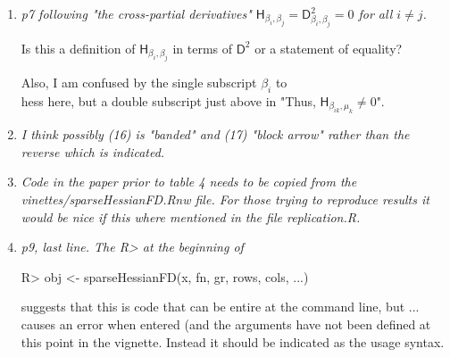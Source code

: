 \documentclass{article}
\newcommand{\parD}[3]{\mathsf{D}^{#1}_{#2}#3}
\newcommand{\hess}[2]{\mathsf{H}_{#1}#2}
\newenvironment{revQuote}{\itshape}{\vspace{\baselineskip}}
\newenvironment{response}{\normalfont}{\vspace{\baselineskip}}
\begin{document}
\begin{enumerate}
\begin{response}
  
\end{response}


\item \begin{revQuote}
p7 following "the cross-partial derivatives"
$\hess{\beta_i,\beta_j}{}=\parD{2}{\beta_i, \beta_j}{}=0$ for all $i\neq
j$.  

  Is this a definition of $\hess{\beta_i,\beta_j}{}$ in terms of  $\parD{2}{}{}$
or a statement of equality?
  
  Also, I am confused by the single subscript $\beta_i$ to \\hess here, but a
double subscript just above in "Thus, $\hess{\beta_{ik},\mu_k}{}\neq 0$".
  \end{revQuote}

\begin{response}
  
\end{response}


\item \begin{revQuote}
 I think possibly (16) is "banded" and (17) "block arrow" rather than the
reverse which is indicated.
  \end{revQuote}

\begin{response}
  
\end{response}


\item \begin{revQuote}
Code in the paper prior to table 4 needs to be copied from the
vinettes/sparseHessianFD.Rnw file. For those trying to reproduce results it
would be nice if this where mentioned in the file replication.R.
  \end{revQuote}

\begin{response}
  
\end{response}


\item \begin{revQuote}
p9, last line. The R> at the beginning of
 
   R> obj <- sparseHessianFD(x, fn, gr, rows, cols, ...)

suggests that this is code that can be entire at the command line, but ...
causes an error when entered (and the arguments have not been defined at
this point in the vignette. Instead it should be indicated as the usage
syntax.
  \end{revQuote}


\end{enumerate}
\end{document}
